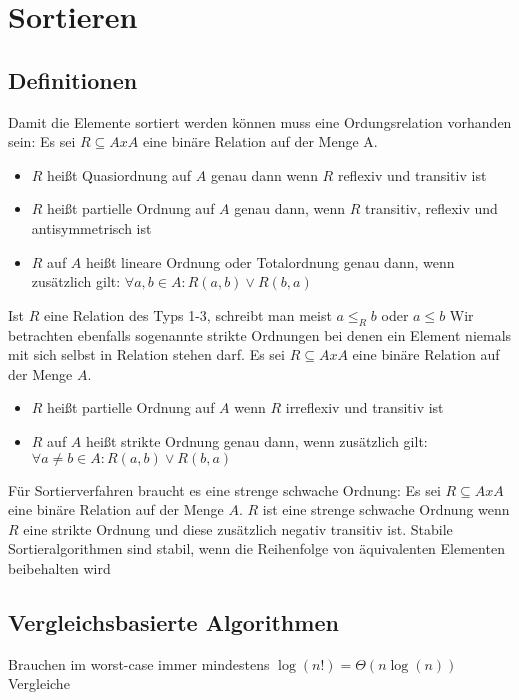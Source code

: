 	\section{Sortieren}
	\subsection{Definitionen}
	Damit die Elemente sortiert werden können muss eine Ordungsrelation vorhanden sein: \newline \newline
	Es sei $R\subseteq AxA$ eine binäre Relation auf der Menge A.
	\begin{itemize}
		\item $R$ heißt Quasiordnung auf $A$ genau dann wenn $R$ reflexiv und transitiv ist
		\item $R$ heißt partielle Ordnung auf $A$ genau dann, wenn $R$ transitiv, reflexiv und antisymmetrisch ist
		\item $R$ auf $A$ heißt lineare Ordnung oder Totalordnung genau dann, wenn zusätzlich gilt: $\forall a, b\in A:R(a, b)\lor R(b, a)$
	\end{itemize}
	Ist $R$ eine Relation des Typs 1-3, schreibt man meist $a\leq_Rb$ oder $a\leq b$ \newline
	Wir betrachten ebenfalls sogenannte strikte Ordnungen bei denen ein Element niemals mit sich selbst in Relation  stehen darf. \newline \newline
	Es sei $R\subseteq AxA$ eine binäre Relation auf der Menge $A$.
	\begin{itemize}
	  \item $R$ heißt partielle Ordnung auf $A$ wenn $R$ irreflexiv und transitiv ist
	  \item $R$ auf $A$ heißt strikte Ordnung genau dann, wenn zusätzlich gilt: \newline
	  		$\forall a\not= b\in A:R(a,b)\lor R(b,a)$
	\end{itemize} 
	Für Sortierverfahren braucht es eine strenge schwache Ordnung: \newline \newline
	Es sei $R\subseteq AxA$ eine binäre Relation auf der Menge $A$. $R$ ist eine strenge schwache Ordnung wenn $R$ eine strikte Ordnung und diese zusätzlich negativ transitiv ist. \newline
	Stabile Sortieralgorithmen sind stabil, wenn die Reihenfolge von äquivalenten Elementen beibehalten wird
	\newpage
	\subsection{Vergleichsbasierte Algorithmen}
	Brauchen im worst-case immer mindestens $\log(n!)=\Theta(n\log(n))$ Vergleiche
